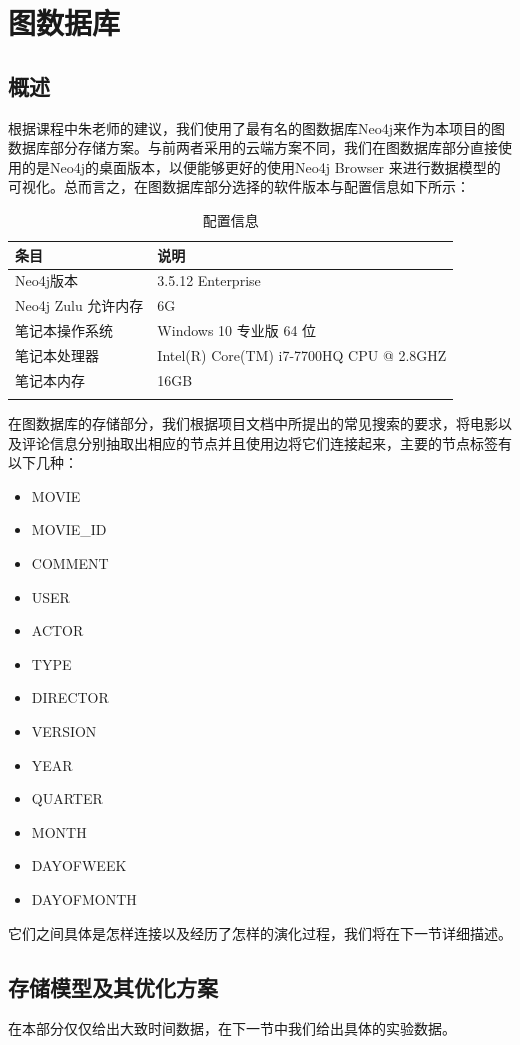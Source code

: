 \documentclass{ctexrep}
\begin{document}
	\section{图数据库}
	\subsection{概述}
	根据课程中朱老师的建议，我们使用了最有名的图数据库Neo4j来作为本项目的图数据库部分存储方案。与前两者采用的云端方案不同，我们在图数据库部分直接使用的是Neo4j的桌面版本，以便能够更好的使用Neo4j Browser 来进行数据模型的可视化。总而言之，在图数据库部分选择的软件版本与配置信息如下所示：
	\begin{longtable}{l|l}
		\hline
		条目 & 说明\\
		\hline
		\hline
		Neo4j版本 & 3.5.12 Enterprise\\
		Neo4j Zulu 允许内存 & 6G \\
		\hline
		笔记本操作系统 & Windows 10 专业版 64 位 \\
		笔记本处理器 & Intel(R) Core(TM) i7-7700HQ CPU @ 2.8GHZ \\
		笔记本内存 & 16GB\\
		\hline
		\caption{配置信息}
	\end{longtable}
	在图数据库的存储部分，我们根据项目文档中所提出的常见搜索的要求，将电影以及评论信息分别抽取出相应的节点并且使用边将它们连接起来，主要的节点标签有以下几种：\begin{itemize}
	  	\item MOVIE
	  	\item MOVIE\_ID
	  	\item COMMENT
	  	\item USER
	  	\item ACTOR
	  	\item TYPE
	  	\item DIRECTOR
	  	\item VERSION
	  	\item YEAR
	  	\item QUARTER
	  	\item MONTH
	  	\item DAYOFWEEK
	  	\item DAYOFMONTH
	\end{itemize}
	它们之间具体是怎样连接以及经历了怎样的演化过程，我们将在下一节详细描述。
	\subsection{存储模型及其优化方案}
	在本部分仅仅给出大致时间数据，在下一节中我们给出具体的实验数据。
\end{document}
